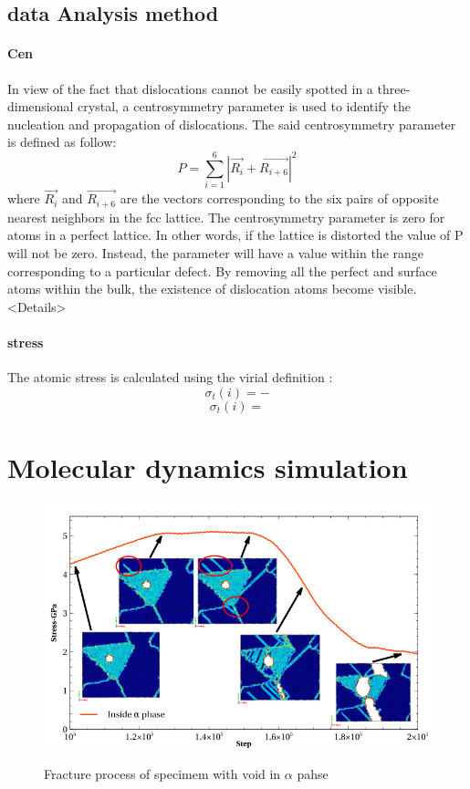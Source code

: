 \documentclass[review]{elsarticle}
\begin{document}
\subsection{data Analysis method}
\paragraph{Cen}
In view of the fact that dislocations cannot be easily spotted in a three-dimensional crystal, a centrosymmetry parameter \cite{C.L. Kelchner1998} is used to identify the nucleation and propagation of dislocations. The said centrosymmetry parameter is defined as follow:
$$P = \displaystyle\sum_{i=1}^{6}|\vec{R_i}+\vec{R_{i+6}}|^2$$
where $\vec{R_i}$ and $\vec{R_{i+6}}$ are the vectors corresponding to the six pairs of opposite nearest neighbors in the fcc lattice. The centrosymmetry parameter is zero for atoms in a perfect lattice. In other words, if the lattice is distorted the value of P will not be zero. Instead, the parameter will have a value within the range corresponding to a particular defect. By removing all the perfect and surface atoms within the bulk, the existence of dislocation atoms become visible.<Details>
\paragraph{stress}
The atomic stress is calculated using the virial definition :
$$\sigma_t(i)=-$$
$$\sigma_t(i)= $$
\section{Molecular dynamics simulation}


\begin{figure}
	\centering
	\includegraphics[width=1\linewidth]{img/process-ia}
	\label{fig:process.ia}
	\caption{Fracture process of specimem with void in $\alpha$ pahse}
\end{figure}
\end{document}
